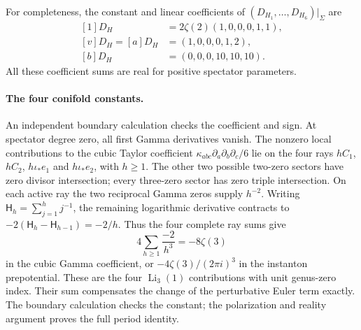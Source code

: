 For completeness, the constant and linear coefficients of
$(D_{H_1},\ldots,D_{H_6})|_\Sigma$ are
\begin{equation}
 \begin{aligned}
 [1]D_H&=2\zeta(2)(1,0,0,0,1,1),\\
 [v]D_H=[a]D_H&=(1,0,0,0,1,2),\\
 [b]D_H&=(0,0,0,10,10,10).
 \end{aligned}
 \label{eq:x9-magnetic-endpoint-coefficients}
\end{equation}
All these coefficient sums are real for positive spectator parameters.

\paragraph{The four conifold constants.}
An independent boundary calculation checks the coefficient and sign.
At spectator degree zero, all first Gamma derivatives vanish. The
nonzero local contributions to the cubic Taylor coefficient
$\kappa_{abc}\partial_a\partial_b\partial_c/6$ lie on the four
rays $hC_1$, $hC_2$, $h\iota_*e_1$ and $h\iota_*e_2$, with $h\geq1$.
The other two possible two-zero sectors have zero divisor
intersection; every three-zero sector has zero triple intersection.
On each active ray the two reciprocal Gamma zeros supply $h^{-2}$.
Writing $\mathsf H_h=\sum_{j=1}^h j^{-1}$, the remaining
logarithmic derivative contracts to
$-2(\mathsf H_h-\mathsf H_{h-1})=-2/h$. Thus the four complete
ray sums give
\begin{equation}
 4\sum_{h\geq1}\frac{-2}{h^3}=-8\zeta(3)
 \label{eq:x9-d6-four-tails}
\end{equation}
in the cubic Gamma coefficient, or
$-4\zeta(3)/(2\pi i)^3$ in the instanton prepotential. These are
the four $\operatorname{Li}_3(1)$ contributions with unit genus-zero
index. Their sum compensates the change of the perturbative Euler
term exactly. The boundary calculation checks the constant; the
polarization and reality argument proves the full period identity.

